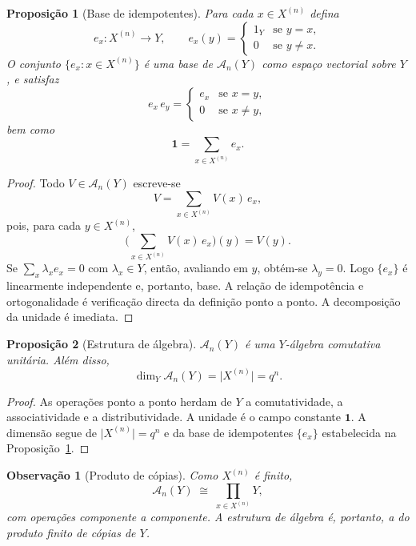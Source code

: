 \documentclass[11pt,a4paper]{article}
\newtheorem{proposicao}{Proposição}
\newtheorem{observacao}{Observação}
\begin{document}
\begin{proposicao}[Base de idempotentes]
\label{prop:idempotentes}
Para cada \(x\in X^{(n)}\) defina
\[
e_x\colon X^{(n)}\to Y,
\qquad
e_x(y)
=
\begin{cases}
1_Y & \text{se }y=x,\\
0 & \text{se }y\neq x.
\end{cases}
\]
O conjunto \(\{e_x:x\in X^{(n)}\}\) é uma base de \(\mathcal A_n(Y)\) como espaço vectorial sobre \(Y\), e satisfaz
\[
e_x\,e_y
=
\begin{cases}
e_x & \text{se }x=y,\\
0 & \text{se }x\neq y,
\end{cases}
\]
bem como
\[
\mathbf 1
=
\sum_{x\in X^{(n)}} e_x.
\]
\end{proposicao}

\begin{proof}
Todo \(V\in\mathcal A_n(Y)\) escreve-se
\[
V
=
\sum_{x\in X^{(n)}}
V(x)\,e_x,
\]
pois, para cada \(y\in X^{(n)}\),
\[
\biggl(\sum_{x\in X^{(n)}}V(x)\,e_x\biggr)(y)
=
V(y).
\]
Se \(\sum_{x}\lambda_x e_x=0\) com \(\lambda_x\in Y\), então, avaliando em \(y\), obtém-se \(\lambda_y=0\). Logo \(\{e_x\}\) é linearmente independente e, portanto, base.
A relação de idempotência e ortogonalidade é verificação directa da definição ponto a ponto.
A decomposição da unidade é imediata.
\end{proof}

\begin{proposicao}[Estrutura de álgebra]
\label{prop:algebra}
\(\mathcal A_n(Y)\) é uma \(Y\)-álgebra comutativa unitária.
Além disso,
\[
\dim_Y\mathcal A_n(Y)
=
\lvert X^{(n)}\rvert
=
q^{n}.
\]
\end{proposicao}

\begin{proof}
As operações ponto a ponto herdam de \(Y\) a comutatividade, a associatividade e a distributividade.
A unidade é o campo constante \(\mathbf 1\).
A dimensão segue de \(\lvert X^{(n)}\rvert=q^{n}\) e da base de idempotentes \(\{e_x\}\) estabelecida na Proposição~\ref{prop:idempotentes}.
\end{proof}

\begin{observacao}[Produto de cópias]
\label{obs:produto-copias}
Como \(X^{(n)}\) é finito,
\[
\mathcal A_n(Y)
\;\cong\;
\prod_{x\in X^{(n)}} Y,
\]
com operações componente a componente.
A estrutura de álgebra é, portanto, a do produto finito de cópias de \(Y\).
\end{observacao}
\end{document}

